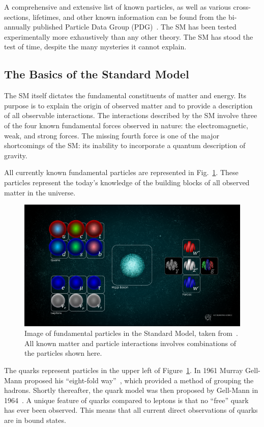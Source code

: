 A comprehensive and extensive list of known particles, as well as various cross-sections, lifetimes, and other known information can be found from the bi-annually published Particle Data Group (PDG)~\citep{Workman:2022ynf}.
The SM has been tested experimentally more exhaustively than any other theory.
The SM has stood the test of time, despite the many mysteries it cannot explain.

\subsection{The Basics of the Standard Model}
The SM itself dictates the fundamental constituents of matter and energy.
Its purpose is to explain the origin of observed matter and to provide a description of all observable interactions.
The interactions described by the SM involve three of the four known fundamental forces observed in nature: the electromagnetic, weak, and strong forces.
The missing fourth force is one of the major shortcomings of the SM: its inability to incorporate a quantum description of gravity.

All currently known fundamental particles are represented in Fig.~\ref{fig:cern_sm}.
These particles represent the today's knowledge of the building blocks of all observed matter in the universe.

\begin{figure}[]
\centering
\includegraphics[width=\textwidth]{images/STDM_higgs_and_field_D.png}
\caption{Image of fundamental particles in the Standard Model, taken from~\citep{dominguez_2015}.
  All known matter and particle interactions involves combinations of the particles shown here.}
\label{fig:cern_sm}
\end{figure}

The quarks represent particles in the upper left of Figure~\ref{fig:cern_sm}.
In 1961 Murray Gell-Mann proposed his ``eight-fold way''~\citep{eightfold_way_osti_4008239}, which provided a method of grouping the hadrons.
Shortly thereafter, the quark model was then proposed by Gell-Mann in 1964~\citep{quark_model_GELLMANN1964214}.
A unique feature of quarks compared to leptons is that no ``free'' quark has ever been observed.
This means that all current direct observations of quarks are in bound states.

